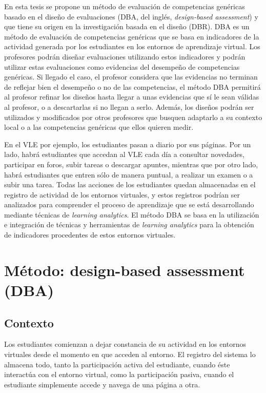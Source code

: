 En esta tesis se propone un método de evaluación de competencias genéricas basado en el diseño de evaluaciones (DBA, del inglés, \emph{design-based assessment}) y que tiene su origen en la investigación basada en el diseño (DBR). DBA es un método de evaluación de competencias genéricas que se basa en indicadores de la actividad generada por los estudiantes en los entornos de aprendizaje virtual. Los profesores podrán diseñar evaluaciones utilizando estos indicadores y podrán utilizar estas evaluaciones como evidencias del desempeño de competencias genéricas. Si llegado el caso, el profesor considera que las evidencias no terminan de reflejar bien el desempeño o no de las competencias, el método DBA permitirá al profesor refinar los diseños hasta llegar a unas evidencias que sí le sean válidas al profesor, o a descartarlas si no llegan a serlo. Además, los diseños podrán ser utilizados y modificados por otros profesores que busquen adaptarlo a su contexto local o a las competencias genéricas que ellos quieren medir. 

En el VLE por ejemplo, los estudiantes pasan a diario por sus páginas. Por un lado, habrá estudiantes que accedan al VLE cada día a consultar novedades, participar en foros, subir tareas o descargar apuntes, mientras que por otro lado, habrá estudiantes que entren sólo de manera puntual, a realizar un examen o a subir una tarea. Todas las acciones de los estudiantes quedan almacenadas en el registro de actividad de los entornos virtuales, y estos registros podrían ser analizados para comprender el proceso de aprendizaje que se está desarrollando mediante técnicas de \emph{learning analytics}. El método DBA se basa en la utilización e integración de técnicas y herramientas de \emph{learning analytics} para la obtención de indicadores procedentes de estos entornos virtuales.


\section{Método: design-based assessment (DBA)}

\subsection{Contexto}

Los estudiantes comienzan a dejar constancia de su actividad en los entornos virtuales desde el momento en que acceden al entorno. El registro del sistema lo almacena todo, tanto la participación activa del estudiante, cuando éste interactúa con el entorno virtual, como la participación pasiva, cuando el estudiante simplemente accede y navega de una página a otra. 

